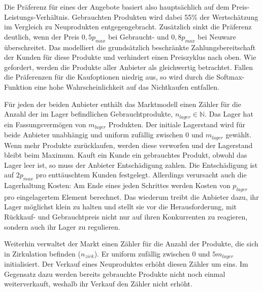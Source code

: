 Die Präferenz für eines der Angebote basiert also hauptsächlich auf dem Preis-Leistungs-Verhältnis.
Gebrauchten Produkten wird dabei 55\% der Wertschätzung im Vergleich zu Neuprodukten entgegengebracht.
Zusätzlich sinkt die Präferenz deutlich, wenn der Preis $0,5 p_{max}$ bei Gebraucht- und $0,8 p_{max}$ bei Neuware überschreitet.
Das modelliert die grundsätzlich beschränkte Zahlungsbereitschaft der Kunden für diese Produkte und verhindert einen Preiszyklus nach oben.
Wie gefordert, werden die Produkte aller Anbieter als gleichwertig betrachtet.
Fallen die Präferenzen für die Kaufoptionen niedrig aus, so wird durch die Softmax-Funktion eine hohe Wahrscheinlichkeit auf das Nichtkaufen entfallen.

Für jeden der beiden Anbieter enthält das Marktmodell einen Zähler für die Anzahl der im Lager befindlichen Gebrauchtprodukte, $n_{lager} \in \mathbb{N}$.
Das Lager hat ein Fassungsvermögen von $m_{lager}$ Produkten.
Der initiale Lagerstand wird für beide Anbieter unabhängig und uniform zufällig zwischen $0$ und $m_{lager}$ gewählt.
Wenn mehr Produkte zurücklaufen, werden diese verworfen und der Lagerstand bleibt beim Maximum.
Kauft ein Kunde ein gebrauchtes Produkt, obwohl das Lager leer ist, so muss der Anbieter Entschädigung zahlen.
Die Entschädigung ist auf $2 p_{max}$ pro enttäuschtem Kunden festgelegt.
Allerdings verursacht auch die Lagerhaltung Kosten: Am Ende eines jeden Schrittes werden Kosten von $p_{lager}$ pro eingelagertem Element berechnet.
Das wiederum treibt die Anbieter dazu, ihr Lager möglichst klein zu halten und stellt sie vor die Herausforderung, mit Rückkauf- und Gebrauchtpreis nicht nur auf ihren Konkurrenten zu reagieren, sondern auch ihr Lager zu regulieren.

Weiterhin verwaltet der Markt einen Zähler für die Anzahl der Produkte, die sich in Zirkulation befinden ($n_{zirk}$).
Er uniform zufällig zwischen $0$ und $5 m_{lager}$ initialisiert.
Der Verkauf eines Neuproduktes erhöht diesen Zähler um eins.
Im Gegensatz dazu werden bereits gebrauchte Produkte nicht noch einmal weiterverkauft, weshalb ihr Verkauf den Zähler nicht erhöht.

